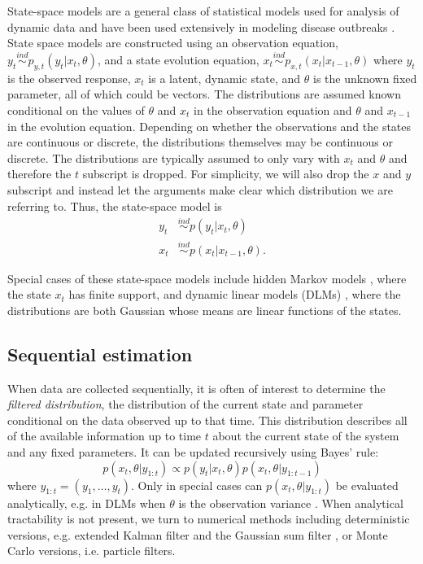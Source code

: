 \documentclass{elsarticle}
\begin{document}
State-space models are a general class of statistical models used for analysis of dynamic data and have been used extensively in modeling disease outbreaks \citep{Mart:Cone:Lope:Lope:baye:2008,watkins2009disease,merl2009statistical,ludkovski2010optimal,skvortsov2012monitoring}.  State space models are constructed using an observation equation, $y_t \stackrel{ind}{\sim} p_{y,t}(y_t|x_t,\theta)$, and a state evolution equation, $x_t \stackrel{ind}{\sim} p_{x,t}(x_t|x_{t-1},\theta)$ where $y_t$ is the observed response, $x_t$ is a latent, dynamic state, and $\theta$ is the unknown fixed parameter, all of which could be vectors. The distributions are assumed known conditional on the values of $\theta$ and $x_t$ in the observation equation and $\theta$ and $x_{t-1}$ in the evolution equation. Depending on whether the observations and the states are continuous or discrete, the distributions themselves may be continuous or discrete. The distributions are typically assumed to only vary with $x_t$ and $\theta$ and therefore the $t$ subscript is dropped.
For simplicity, we will also drop the $x$ and $y$ subscript and instead let the arguments make clear which distribution we are referring to. Thus, the state-space model is
\begin{align*}
y_t &\stackrel{ind}{\sim} p(y_t|x_t,\theta) \\
x_t &\stackrel{ind}{\sim} p(x_t|x_{t-1},\theta).
\end{align*}

Special cases of these state-space models include hidden Markov models \citep{cappe2005inference}, where the state $x_t$ has finite support, and dynamic linear models (DLMs) \citep{West:Harr:baye:1997}, where the distributions are both Gaussian whose means are linear functions of the states.

\subsection{Sequential estimation}

When data are collected sequentially, it is often of interest to determine the \emph{filtered distribution}, the distribution of the current state and parameter conditional on the data observed up to that time. This distribution describes all of the available information up to time $t$ about the current state of the system and any fixed parameters. It can be updated recursively using Bayes' rule:
\begin{equation}
p(x_t,\theta| y_{1:t}) \propto p(y_t|x_t,\theta)p(x_t,\theta|y_{1:t-1}) \label{eqn:filtered}
\end{equation}
where $y_{1:t} = (y_1,\ldots,y_t)$. Only in special cases can $p(x_t,\theta| y_{1:t})$ be evaluated analytically, e.g. in DLMs when $\theta$ is the observation variance \cite[Sec 4.3,][]{petris2009dynamic}. When analytical tractability is not present, we turn to numerical methods including deterministic versions, e.g. extended Kalman filter and the Gaussian sum filter \citep{Alsp:Sore:nonl:1972}, or Monte Carlo versions, i.e. particle filters.
\end{document}
